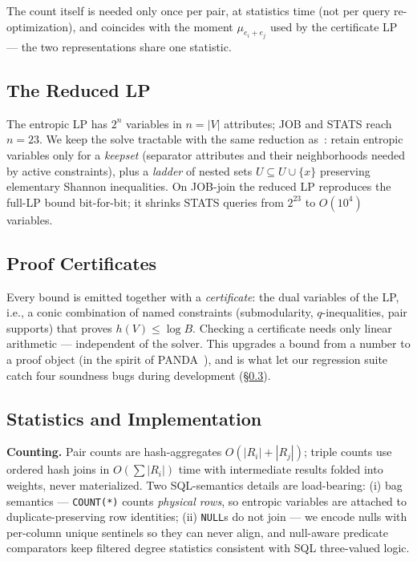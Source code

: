 The count itself is needed only once per pair, at statistics time
(not per query re-optimization), and coincides with the moment
$\mu_{e_i+e_j}$ used by the certificate LP --- the two
representations share one statistic.

\subsection{The Reduced LP}
\label{sec:reduced}

The entropic LP has $2^n$ variables in $n = |V|$ attributes; JOB and
STATS reach $n = 23$.  We keep the solve tractable with the same
reduction as~\cite{zhang2025lpbound}: retain entropic variables only
for a \emph{keepset} (separator attributes and their neighborhoods
needed by active constraints), plus a \emph{ladder} of nested sets
$U \subseteq U \cup \{x\}$ preserving elementary Shannon
inequalities.  On JOB-join the reduced LP reproduces the full-LP
bound bit-for-bit; it shrinks STATS queries from $2^{23}$ to
$O(10^4)$ variables.

\subsection{Proof Certificates}
\label{sec:cert}

Every bound is emitted together with a \emph{certificate}: the dual
variables of the LP, i.e., a conic combination of named constraints
(submodularity, $q$-inequalities, pair supports) that proves
$h(V) \le \log B$.  Checking a certificate needs only linear
arithmetic --- independent of the solver.  This upgrades a bound from
a number to a proof object (in the spirit of
PANDA~\cite{abokhamis2017panda}), and is what let our regression
suite catch four soundness bugs during development
(\S\ref{sec:impl}).

\subsection{Statistics and Implementation}
\label{sec:impl}

\textbf{Counting.}
Pair counts are hash-aggregates $O(|R_i|{+}|R_j|)$; triple counts use
ordered hash joins in $O(\sum|R_i|)$ time with intermediate results
folded into weights, never materialized.  Two SQL-semantics details
are load-bearing: (i) bag semantics --- \texttt{COUNT(*)} counts
\emph{physical rows}, so entropic variables are attached to
duplicate-preserving row identities; (ii) \texttt{NULL}s do not join
--- we encode nulls with per-column unique sentinels so they can
never align, and null-aware predicate comparators keep filtered
degree statistics consistent with SQL three-valued logic.

